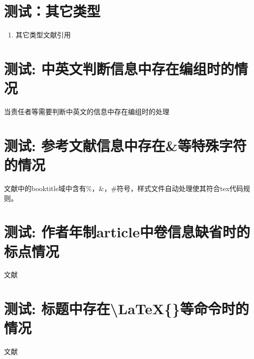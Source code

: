 \documentclass[twoside]{article}
\begin{document}
\section{测试：其它类型}
\begin{refsection}
\begin{enumerate}
  \item 其它类型文献引用\cite{gom,gom1,gom2}
\end{enumerate}

{
\printbibliography%
}
\end{refsection}


    \section{测试: 中英文判断信息中存在编组时的情况}
\begin{refsection}
当责任者等需要判断中英文的信息中存在编组时的处理
\cite{IFLAI1977b--,IFLAI1977--}
\cite{r27-BenHadjAlaya-FekiA.2008-1-5,中国企业投资协会2014--,中国企业投资协会2015--}

\printbibliography[heading=subbibliography,title=【中英文判断信息中存在编组的测试】]
\end{refsection}


    \section{测试: 参考文献信息中存在\&等特殊字符的情况}
\begin{refsection}
文献中\cite{ref-replace-char}的booktitle域中含有\%，\&，\#符号，样式文件自动处理使其符合tex代码规则。
\printbibliography[heading=subbibliography,title=【处理参考文献信息中\&等特殊字符】]
\end{refsection}

\section{测试: 作者年制article中卷信息缺省时的标点情况}
\begin{refsection}
文献\cite{刘彻东1998-38-39}\cite{亚洲地质图编目组1978-194-208}
\cite{高光明1998-60-65}

\printbibliography[heading=subbibliography,title=【author-year style: article without volume】]
\end{refsection}

\section{测试: 标题中存在\textbackslash LaTeX\{\}等命令时的情况}

\begin{refsection}
文献\cite{Peebles2001-100-100}\cite{赵凯华1995--}\cite{蒋有绪1998--}

\printbibliography[heading=subbibliography,title=【title with \textbackslash LaTeX\{\}】]
\end{refsection}




    
\end{document}
